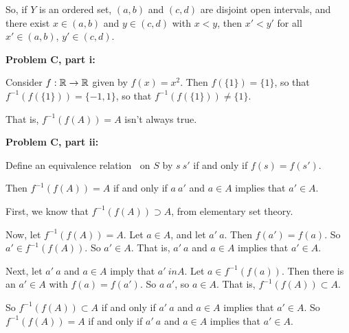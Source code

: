 \documentclass[a4paper,12pt]{article}
\begin{document}
So, if $Y$ is an ordered set,  $(a,b)$ and $(c,d)$ are disjoint open intervals, and there exist $x \in (a,b)$ and $y \in (c,d)$ with $x<y$, then $x'<y'$ for all $x' \in (a,b)$, $y' \in (c,d)$.

\shunt

{\bf Problem C, part i:}

Consider $f: \mathbb{R} \to \mathbb{R}$ given by $f(x) = x^2$. Then $f(\{1\}) = \{1\}$, so that $f^{-1}(f(\{1\})) = \{-1,1\}$, so that $f^{-1}(f(\{1\})) \neq \{1\}$.

That is, $f^{-1}(f(A)) = A$ isn't always true.

\shunt

{\bf Problem C, part ii:}

Define an equivalence relation $~$ on $S$ by $s~s'$ if and only if $f(s) = f(s')$.

Then $f^{-1}(f(A)) = A$ if and only if $a ~ a'$ and $a \in A$ implies that $a' \in A$.

First, we know that $f^{-1}(f(A)) \supset A$, from elementary set theory. 

Now, let $f^{-1}(f(A)) = A$. Let $a \in A$, and let $a' ~ a$. Then $f(a') = f(a)$. So $a' \in f^{-1}(f(A))$. So $a' \in A$. That is, $a' ~a$ and $a \in A$ implies that $a' \in A$. %

Next, let $a' ~ a$ and $a \in A$ imply that $a' \ in A$. Let $a \in f^{-1}(f(a))$. Then there is an $a' \in A$ with $f(a) = f(a')$. So $a~a'$, so $a \in A$. That is, $f^{-1}(f(A)) \subset A$.

So $f^{-1}(f(A)) \subset A$ if and only if $a' ~ a$ and $a \in A$ implies that $a' \in A$. So $f^{-1}(f(A)) = A$ if and only if $a' ~ a$ and $a \in A$ implies that $a' \in A$. 

\shunt
\end{document}
